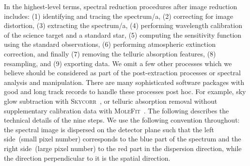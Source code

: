 \documentclass[linenumbers, twocolumn]{aastex631}
\begin{document}
In the highest-level terms, spectral reduction procedures after image reduction
includes: (1) identifying and tracing the spectrum/a, (2) correcting for image
distortion, (3) extracting the spectrum/a, (4) performing wavelength
calibration of the science target and a standard star, (5) computing the
sensitivity function using the standard observations, (6) performing atmospheric
extinction correction, and finally (7) removing the telluric absorption
features, (8) resampling, and (9) exporting data. We omit a few other
processes which we believe should be considered as part of the post-extraction
processes or spectral analysis and manipulation. There are many sophisticated 
software packages with good and long track records to handle these processes
post hoc. For example, sky glow subtraction with
\textsc{Skycorr}~\citep{2014A&A...567A..25N}, or telluric
absorption removal without supplementary calibration data with
\textsc{MoleFit}~\citep{2015A&A...576A..77S, 2015A&A...576A..78K}.
The following describes the technical details of the nine steps. We use the
following convention throughout: the spectral image is dispersed on the detector
plane such that the left side~(small pixel number) corresponds to the blue part
of the spectrum and the right side~(large pixel number) to the red part in the
dispersion direction, while the direction perpendicular to it is the spatial
direction.

\end{document}
